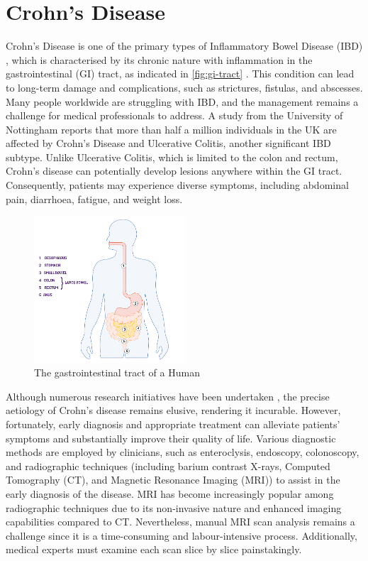 \section{Crohn's Disease}
Crohn's Disease \cite{baumgart2012crohn,crohnsNHS} is one of the primary types of Inflammatory Bowel Disease (IBD) \cite{IBDCDC}, which is characterised by its chronic nature with inflammation in the gastrointestinal (GI) tract, as indicated in \autoref{fig:gi-tract} \cite{digestio98:online}. This condition can lead to long-term damage and complications, such as strictures, fistulas, and abscesses. Many people worldwide are struggling with IBD, and the management remains a challenge for medical professionals to address. A study from the University of Nottingham \cite{UoNResearch} reports that more than half a million individuals in the UK are affected by Crohn's Disease and Ulcerative Colitis, another significant IBD subtype. Unlike Ulcerative Colitis, which is limited to the colon and rectum, Crohn's disease can potentially develop lesions anywhere within the GI tract. Consequently, patients may experience diverse symptoms, including abdominal pain, diarrhoea, fatigue, and weight loss.
\begin{figure}[htp]
    \centering
    \includegraphics[width=0.5\textwidth]{figures/digestion-graphic.jpg}
    \caption{The gastrointestinal tract of a Human}
    \label{fig:gi-tract}
\end{figure}

Although numerous research initiatives have been undertaken \cite{hoarau2016bacteriome,feuerstein2021aga}, the precise aetiology of Crohn's disease remains elusive, rendering it incurable. However, fortunately, early diagnosis and appropriate treatment can alleviate patients' symptoms and substantially improve their quality of life. Various diagnostic methods are employed by clinicians, such as enteroclysis, endoscopy, colonoscopy, and radiographic techniques (including barium contrast X-rays, Computed Tomography (CT), and Magnetic Resonance Imaging (MRI)) to assist in the early diagnosis of the disease. MRI has become increasingly popular among radiographic techniques due to its non-invasive nature and enhanced imaging capabilities compared to CT. Nevertheless, manual MRI scan analysis remains a challenge since it is a time-consuming and labour-intensive process. Additionally, medical experts must examine each scan slice by slice painstakingly.

